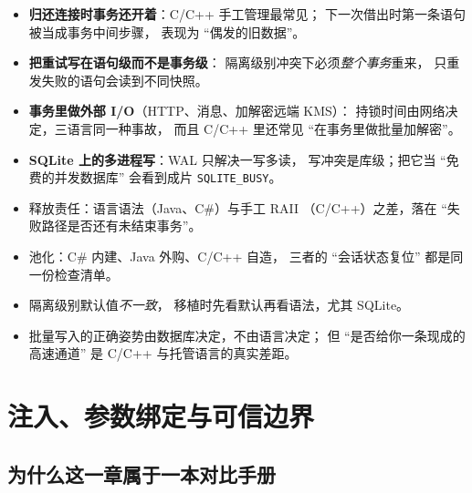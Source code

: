 \documentclass[12pt,a4paper,fontset=fandol]{ctexbook}
\newcommand{\Tp}[1]{\texttt{#1}}
\newcommand{\CSharp}{C\#}
\newcommand{\CppJava}{C/C++}
\begin{document}
\begin{warning}[title=四个跨语言的并发事故]
\begin{itemize}
  \item \textbf{归还连接时事务还开着}：\CppJava{} 手工管理最常见；
        下一次借出时第一条语句被当成事务中间步骤，
        表现为 ``偶发的旧数据''。
  \item \textbf{把重试写在语句级而不是事务级}：
        隔离级别冲突下必须\emph{整个事务}重来，
        只重发失败的语句会读到不同快照。
  \item \textbf{事务里做外部 I/O}（HTTP、消息、加解密远端 KMS）：
        持锁时间由网络决定，三语言同一种事故，
        而且 \CppJava{} 里还常见 ``在事务里做批量加解密''。
  \item \textbf{SQLite 上的多进程写}：WAL 只解决一写多读，
        写冲突是库级；把它当 ``免费的并发数据库''
        会看到成片 \Tp{SQLITE\_BUSY}。
\end{itemize}
\end{warning}

\begin{guideline}[title=本章要点]
\begin{itemize}
  \item 释放责任：语言语法（Java、\CSharp{}）与手工 RAII
        （\CppJava{}）之差，落在 ``失败路径是否还有未结束事务''。
  \item 池化：\CSharp{} 内建、Java 外购、\CppJava{} 自造，
        三者的 ``会话状态复位'' 都是同一份检查清单。
  \item 隔离级别默认值\emph{不一致}，
        移植时先看默认再看语法，尤其 SQLite。
  \item 批量写入的正确姿势由数据库决定，不由语言决定；
        但 ``是否给你一条现成的高速通道''
        是 \CppJava{} 与托管语言的真实差距。
\end{itemize}
\end{guideline}


\chapter{注入、参数绑定与可信边界}

\section{为什么这一章属于一本对比手册}
\end{document}
